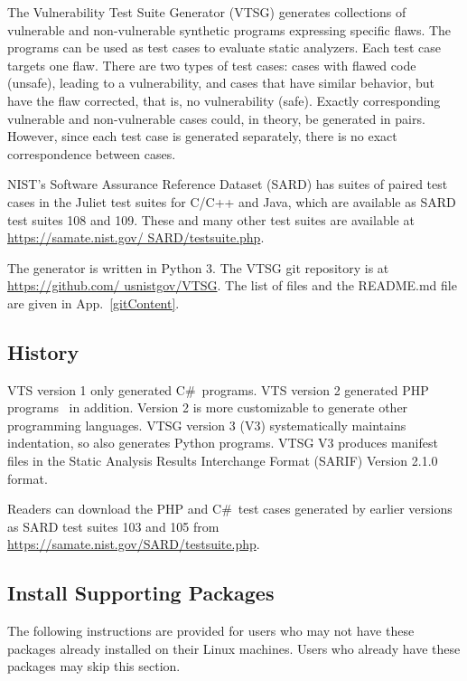 \documentclass[12pt]{article}
\newcommand{\CSharp}{C{\fontseries{b}\selectfont\#}}
\begin{document}
The Vulnerability Test Suite Generator (VTSG) generates collections 
of vulnerable and non-vulnerable
synthetic programs expressing specific flaws.  
The programs can be used as 
test cases to evaluate static analyzers. 
Each test case targets one flaw. There are two types of test cases:
cases with flawed code (unsafe), leading to a vulnerability, and cases that
have similar behavior, but have the flaw corrected, that is, no
vulnerability (safe).  Exactly corresponding vulnerable and non-vulnerable
cases could, in theory, be generated in pairs. However, since each test case
is generated separately, there is no exact correspondence between 
cases.

NIST's Software Assurance Reference Dataset (SARD) has suites of paired test cases in
the Juliet test suites for C/C++ and Java, which are available as SARD test suites
108 and 109.  These and many other test suites are available at
\href{https://samate.nist.gov/SARD/testsuite.php}
     {https://samate.nist.gov/ SARD/testsuite.php}.

The generator is written in Python 3.
The VTSG git repository is at
\href{https://github.com/usnistgov/VTSG}{https://github.com/ usnistgov/VTSG}.
The list of files and the README.md file are given in App.~\ref{gitContent}.


\subsection{History} 

VTS version 1 only generated \CSharp\ programs. VTS version 2 generated PHP
programs~\cite{StivaletFongVTSPHP2016} in addition.  Version 2 is more
customizable to generate other programming languages.
VTSG version 3 (V3) systematically maintains indentation, so also
generates Python programs.  VTSG V3 produces manifest files in the
Static Analysis Results Interchange Format (SARIF) 
Version 2.1.0~\cite{SARIF2.1.0} format.

Readers can download the PHP and \CSharp\ test cases generated 
by earlier versions as SARD test suites 103 and 105 from
\href{https://samate.nist.gov/SARD/testsuite.php}{https://samate.nist.gov/SARD/testsuite.php}.


\subsection{Install Supporting Packages}

\noindent The following instructions are provided for users who may not have these
packages already installed on their Linux machines. Users who already have these
packages may skip this section.
\end{document}
